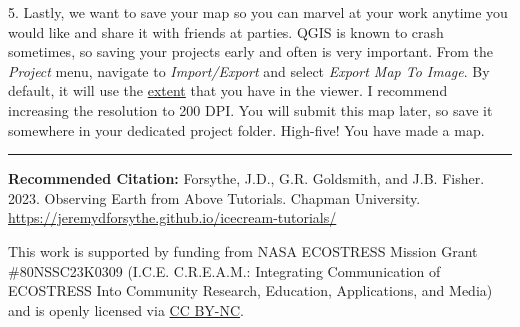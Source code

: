 \documentclass[oneside,a4paper,11pt,explicit]{book}
\begin{document}
\clearpage

5. Lastly, we want to save your map so you can marvel at your work anytime you would like and share it with friends at parties. QGIS is known to crash sometimes, so saving your projects early and often is very important. From the \textit{Project} menu, navigate to \textit{Import/Export} and select \textit{Export Map To Image}. By default, it will use the \href{https://en.wikipedia.org/wiki/Map_extent}{extent} that you have in the viewer. I recommend increasing the resolution to 200 DPI. You will submit this map later, so save it somewhere in your dedicated project folder. High-five! You have made a map. 


\vfill

\hrule

\vspace{1em}

\small \textbf{Recommended Citation:} Forsythe, J.D., G.R. Goldsmith, and J.B. Fisher. 2023. Observing Earth from Above Tutorials. Chapman University. \url{https://jeremydforsythe.github.io/icecream-tutorials/}

\vspace{1em}

This work is supported by funding from NASA ECOSTRESS Mission Grant \#80NSSC23K0309 (I.C.E. C.R.E.A.M.: Integrating Communication of ECOSTRESS Into Community Research, Education, Applications, and Media) and is openly licensed via \href{https://creativecommons.org/licenses/by-nc/4.0/}{CC BY-NC}.
\end{document}
